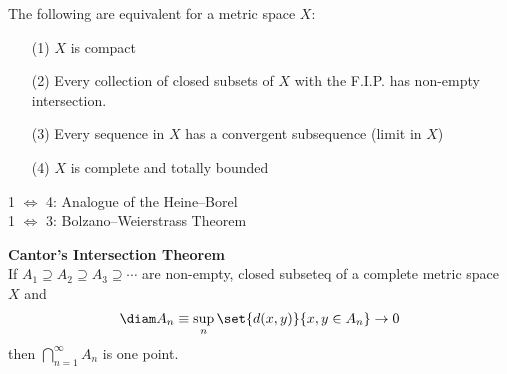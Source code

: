 \thm The following are equivalent for a metric space $X$:
\begin{enumerate}
\item[(1)] $X$ is compact
\item[(2)] Every collection of closed subsets of $X$ with the F.I.P. has non-empty intersection.
\item[(3)] Every sequence in $X$ has a convergent subsequence (limit in $X$)
\item[(4)] $X$ is complete and totally bounded
\end{enumerate}
1 $\iff$ 4: Analogue of the Heine--Borel \\
1 $\iff$ 3: Bolzano--Weierstrass Theorem

\textbf{Cantor's Intersection Theorem} \\
If $A_1\supseteq A_2\supseteq A_3\supseteq\dotsb$ are non-empty, closed subseteq of a complete metric space $X$ and
\[ \diam A_n \equiv \sup_n \set{d(x,y)}{x,y\in A_n} \to 0 \]
then $\bigcap_{n=1}^\infty A_n$ is one point.

